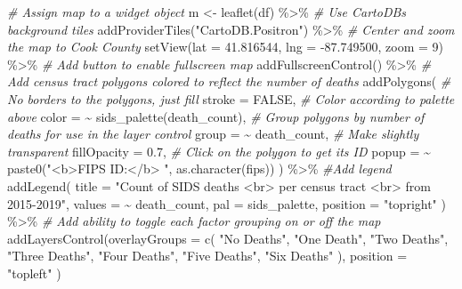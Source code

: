 \documentclass[
]{book}
\newenvironment{Shaded}{\begin{snugshade}}{\end{snugshade}}
\newcommand{\AttributeTok}[1]{\textcolor[rgb]{0.77,0.63,0.00}{#1}}
\newcommand{\CommentTok}[1]{\textcolor[rgb]{0.56,0.35,0.01}{\textit{#1}}}
\newcommand{\ConstantTok}[1]{\textcolor[rgb]{0.00,0.00,0.00}{#1}}
\newcommand{\DecValTok}[1]{\textcolor[rgb]{0.00,0.00,0.81}{#1}}
\newcommand{\FloatTok}[1]{\textcolor[rgb]{0.00,0.00,0.81}{#1}}
\newcommand{\FunctionTok}[1]{\textcolor[rgb]{0.00,0.00,0.00}{#1}}
\newcommand{\NormalTok}[1]{#1}
\newcommand{\OtherTok}[1]{\textcolor[rgb]{0.56,0.35,0.01}{#1}}
\newcommand{\SpecialCharTok}[1]{\textcolor[rgb]{0.00,0.00,0.00}{#1}}
\newcommand{\StringTok}[1]{\textcolor[rgb]{0.31,0.60,0.02}{#1}}
\begin{document}
\begin{Shaded}
\begin{Highlighting}[]
\CommentTok{\# Assign map to a widget object}
\NormalTok{m }\OtherTok{\textless{}{-}} \FunctionTok{leaflet}\NormalTok{(df) }\SpecialCharTok{\%\textgreater{}\%}
    \CommentTok{\# Use CartoDB\textquotesingle{}s background tiles}
    \FunctionTok{addProviderTiles}\NormalTok{(}\StringTok{"CartoDB.Positron"}\NormalTok{) }\SpecialCharTok{\%\textgreater{}\%}
    \CommentTok{\# Center and zoom the map to Cook County}
    \FunctionTok{setView}\NormalTok{(}\AttributeTok{lat =} \FloatTok{41.816544}\NormalTok{, }\AttributeTok{lng =} \SpecialCharTok{{-}}\FloatTok{87.749500}\NormalTok{, }\AttributeTok{zoom =} \DecValTok{9}\NormalTok{) }\SpecialCharTok{\%\textgreater{}\%}
    \CommentTok{\# Add button to enable fullscreen map}
    \FunctionTok{addFullscreenControl}\NormalTok{() }\SpecialCharTok{\%\textgreater{}\%}
    \CommentTok{\# Add census tract polygons colored to reflect the number of deaths}
    \FunctionTok{addPolygons}\NormalTok{(}
        \CommentTok{\# No borders to the polygons, just fill}
        \AttributeTok{stroke =} \ConstantTok{FALSE}\NormalTok{,}
        \CommentTok{\# Color according to palette above}
        \AttributeTok{color =} \SpecialCharTok{\textasciitilde{}} \FunctionTok{sids\_palette}\NormalTok{(death\_count),}
        \CommentTok{\# Group polygons by number of deaths for use in the layer control}
        \AttributeTok{group =} \SpecialCharTok{\textasciitilde{}}\NormalTok{ death\_count,}
        \CommentTok{\# Make slightly transparent}
        \AttributeTok{fillOpacity =} \FloatTok{0.7}\NormalTok{,}
        \CommentTok{\# Click on the polygon to get its ID}
        \AttributeTok{popup =} \SpecialCharTok{\textasciitilde{}} \FunctionTok{paste0}\NormalTok{(}\StringTok{"\textless{}b\textgreater{}FIPS ID:\textless{}/b\textgreater{} "}\NormalTok{, }\FunctionTok{as.character}\NormalTok{(fips))}
\NormalTok{    ) }\SpecialCharTok{\%\textgreater{}\%}
    \CommentTok{\#Add legend}
    \FunctionTok{addLegend}\NormalTok{(}
        \AttributeTok{title =} \StringTok{"Count of SIDS deaths \textless{}br\textgreater{} per census tract \textless{}br\textgreater{} from 2015{-}2019"}\NormalTok{,}
        \AttributeTok{values =} \SpecialCharTok{\textasciitilde{}}\NormalTok{ death\_count,}
        \AttributeTok{pal =}\NormalTok{ sids\_palette,}
        \AttributeTok{position =} \StringTok{"topright"}
\NormalTok{    ) }\SpecialCharTok{\%\textgreater{}\%}
    \CommentTok{\# Add ability to toggle each factor grouping on or off the map}
    \FunctionTok{addLayersControl}\NormalTok{(}\AttributeTok{overlayGroups =} \FunctionTok{c}\NormalTok{(}
                \StringTok{"No Deaths"}\NormalTok{, }
                \StringTok{"One Death"}\NormalTok{, }
                \StringTok{"Two Deaths"}\NormalTok{, }
                \StringTok{"Three Deaths"}\NormalTok{, }
                \StringTok{"Four Deaths"}\NormalTok{, }
                \StringTok{"Five Deaths"}\NormalTok{, }
                \StringTok{"Six Deaths"}
\NormalTok{            ),}
            \AttributeTok{position =} \StringTok{"topleft"}
\NormalTok{        )}
\end{Highlighting}
\end{Shaded}
\end{document}

